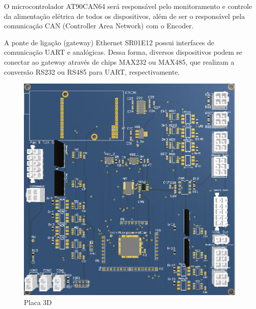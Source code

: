 O microcontrolador AT90CAN64 será responsável pelo monitoramento e controle da
alimentação elétrica de todos os dispositivos, além de ser o respon\-sável pela
comunicação CAN (Controller Area Network) com o Encoder.

A ponte de ligação (gateway) Ethernet SR01E12 possui interfaces de comunicação
UART e analógicas. Des\-sa forma, diversos dispositivos podem se conectar ao
gateway atra\-vés de chips MAX232 ou MAX485, que realizam a conversão RS232 ou RS485 para UART, respectivamente.

\begin{figure}[H]
\centering
\includegraphics[width=1\columnwidth]{figs/eletronica/placav1.png}
\caption{Placa 3D}
\label{placa}
\end{figure}

